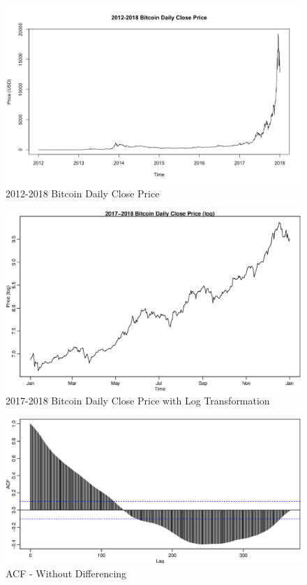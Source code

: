 \documentclass[letterpaper]{article} %
\begin{document}

\begin{figure}
    \includegraphics[width=\linewidth]{2012-2018.png}
    \caption{2012-2018 Bitcoin Daily Close Price}
    \label{figure:2012-2018}
\end{figure}

\begin{figure}
    \includegraphics[width=\linewidth]{2017-2018_log.eps}
    \caption{2017-2018 Bitcoin Daily Close Price with Log Transformation}
    \label{figure:2017-2018 log}
\end{figure}

\begin{figure}
    \includegraphics[width=\linewidth]{acf1.eps}
    \caption{ACF - Without Differencing}
    \label{figure:acf1}
\end{figure}
\end{document}

